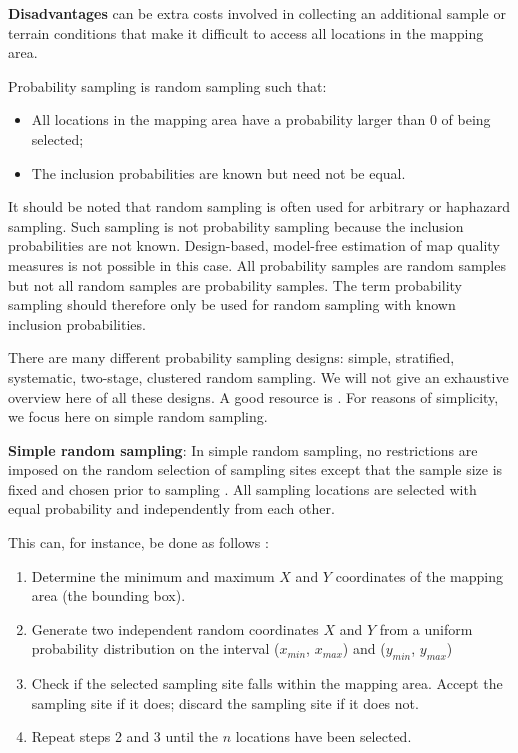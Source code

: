 \documentclass[10pt,b5paper,]{book}
\theoremstyle{definition}
\theoremstyle{definition}
\theoremstyle{definition}
\theoremstyle{remark}
\begin{document}
\textbf{Disadvantages} can be extra costs involved in collecting an
additional sample or terrain conditions that make it difficult to access
all locations in the mapping area.

Probability sampling is random sampling such that:

\begin{itemize}
\item
  All locations in the mapping area have a probability larger than 0 of
  being selected;
\item
  The inclusion probabilities are known but need not be equal.
\end{itemize}

It should be noted that random sampling is often used for arbitrary or
haphazard sampling. Such sampling is not probability sampling because
the inclusion probabilities are not known. Design-based, model-free
estimation of map quality measures is not possible in this case. All
probability samples are random samples but not all random samples are
probability samples. The term probability sampling should therefore only
be used for random sampling with known inclusion probabilities.

There are many different probability sampling designs: simple,
stratified, systematic, two-stage, clustered random sampling. We will
not give an exhaustive overview here of all these designs. A good
resource is \citet{de2006sampling}. For reasons of simplicity, we focus
here on simple random sampling.

\textbf{Simple random sampling}: In simple random sampling, no
restrictions are imposed on the random selection of sampling sites
except that the sample size is fixed and chosen prior to sampling
\citep{de2006sampling}. All sampling locations are selected with equal
probability and independently from each other.

This can, for instance, be done as follows \citep{de2006sampling}:

\begin{enumerate}
\def\labelenumi{\arabic{enumi}.}
\item
  Determine the minimum and maximum \(X\) and \(Y\) coordinates of the
  mapping area (the bounding box).
\item
  Generate two independent random coordinates \(X\) and \(Y\) from a
  uniform probability distribution on the interval (\(x_{min}\),
  \(x_{max}\)) and (\(y_{min}\), \(y_{max}\))
\item
  Check if the selected sampling site falls within the mapping area.
  Accept the sampling site if it does; discard the sampling site if it
  does not.
\item
  Repeat steps 2 and 3 until the \(n\) locations have been selected.
\end{enumerate}
\end{document}
